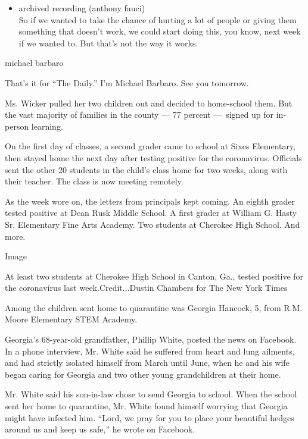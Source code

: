\begin{itemize}
\tightlist
\item
  archived recording (anthony fauci)\\
  So if we wanted to take the chance of hurting a lot of people or
  giving them something that doesn't work, we could start doing this,
  you know, next week if we wanted to. But that's not the way it works.
\end{itemize}

michael barbaro

That's it for ``The Daily.'' I'm Michael Barbaro. See you tomorrow.

Ms. Wicker pulled her two children out and decided to home-school them.
But the vast majority of families in the county --- 77 percent
---~signed up for in-person learning.

On the first day of classes, a second grader came to school at Sixes
Elementary, then stayed home the next day after testing positive for the
coronavirus. Officials sent the other 20 students in the child's class
home for two weeks, along with their teacher. The class is now meeting
remotely.

As the week wore on, the letters from principals kept coming. An eighth
grader tested positive at Dean Rusk Middle School. A first grader at
William G. Hasty Sr. Elementary Fine Arts Academy. Two students at
Cherokee High School. And more.

Image

At least two students at Cherokee High School in Canton, Ga., tested
positive for the coronavirus last week.Credit...Dustin Chambers for The
New York Times

Among the children sent home to quarantine was Georgia Hancock, 5, from
R.M. Moore Elementary STEM Academy.

Georgia's 68-year-old grandfather, Phillip White, posted the news on
Facebook. In a phone interview, Mr. White said he suffered from heart
and lung ailments, and had strictly isolated himself from March until
June, when he and his wife began caring for Georgia and two other young
grandchildren at their home.

Mr. White said his son-in-law chose to send Georgia to school. When the
school sent her home to quarantine, Mr. White found himself worrying
that Georgia might have infected him. ``Lord, we pray for you to place
your beautiful hedges around us and keep us safe,'' he wrote on
Facebook.

\href{https://www.nytimes3xbfgragh.onion/spotlight/schools-reopening?action=click\&pgtype=Article\&state=default\&region=MAIN_CONTENT_3\&context=storylines_keepup}{}

